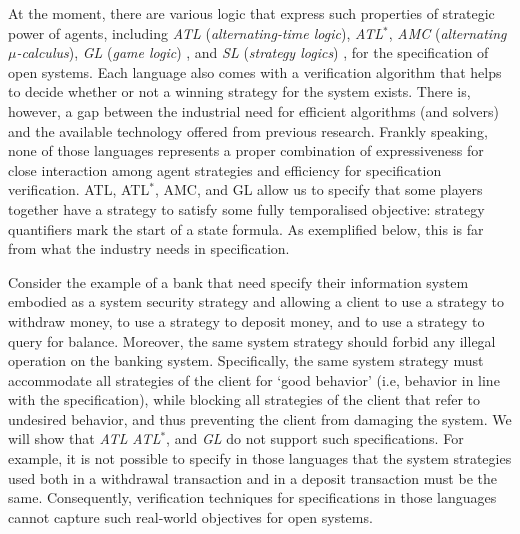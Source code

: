 \documentclass[11pt]{article}
\newcounter{sequent1}
\newcounter{sequent2}
\newcounter{sequent3}
\newcounter{sequent4}
\begin{document}
At the moment, there are various logic that express such properties of strategic power of agents,
including {\em ATL} ({\em alternating-time logic}), 
{\em ATL}$^*$, {\em AMC} ({\em alternating $\mu$-calculus}),
{\em GL} ({\em game logic}) \cite{AHK02}, 
and {\em SL} ({\em strategy logics}) \cite{CLM10,CHP10,MMV10}, 
for the specification of open systems.  
Each language also comes with a verification algorithm that 
helps to decide whether or not a winning strategy for the system exists.  
There is, however, a gap between the industrial need 
for efficient algorithms (and solvers) and the available technology offered from previous research.  
Frankly speaking, 
none of those languages represents a proper combination of 
expressiveness for close interaction among agent strategies 
and efficiency for specification verification.  
ATL, ATL$^*$, AMC, and GL \cite{AHK02} allow 
us to specify that some players together have a strategy to 
satisfy some fully temporalised objective: strategy quantifiers mark the start of a state formula.
As exemplified below, this is far from\label{reply1.falls.short.far.from} what the industry needs in specification.  

Consider the example of a bank that need specify their information system 
embodied as a system security strategy and 
allowing a client to use a strategy to withdraw money, 
to use a strategy to deposit money, and to use a strategy to query for balance.  
Moreover, the same system strategy should forbid any illegal 
operation on the banking system.  
Specifically, the same system strategy must accommodate all strategies 
of the client for `good behavior' 
(i.e, behavior in line with the specification), 
while blocking all strategies of the client that refer to undesired behavior, 
and thus preventing the client from damaging the system.
We will show that 
{\em ATL} %
{\em ATL}$^*$, %
and 
{\em GL} %
\cite{AHK02}  
do not support such specifications.  
For example, it is not possible to specify in those languages that 
the system strategies used both in a withdrawal transaction and 
in a deposit transaction must be the same.  
Consequently, verification techniques for specifications in those languages 
cannot capture such real-world objectives for open systems.  
\end{document}
